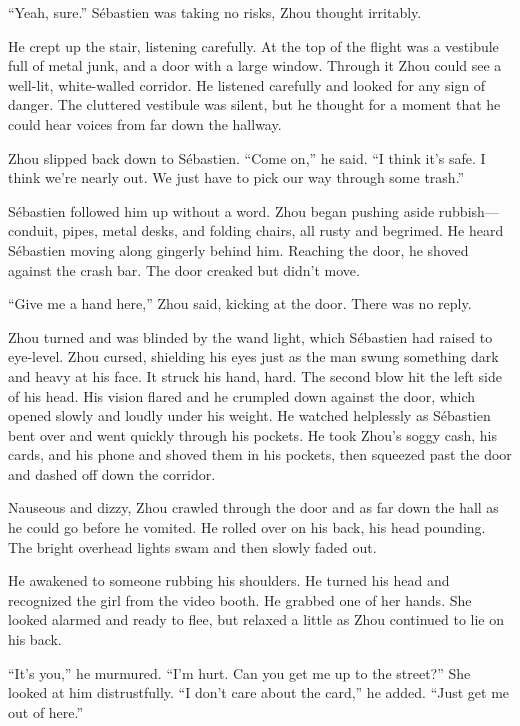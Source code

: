 \documentclass[10pt,a4paper]{article}
\begin{document}
``Yeah, sure.'' S\'{e}bastien was taking no risks, Zhou thought irritably.

He crept up the stair, listening carefully. At the top of the
flight was a vestibule full of metal junk, and a door with a
large window. Through it Zhou could see a well-lit, white-walled
corridor. He listened carefully and looked for any sign of danger.
The cluttered vestibule was silent, but he thought for a moment
that he could hear voices from far down the hallway.

Zhou slipped back down to S\'{e}bastien. ``Come on,'' he said. ``I think
it's safe. I think we're nearly out. We just have to pick our way
through some trash.''

S\'{e}bastien followed him up without a word. Zhou began pushing
aside rubbish---conduit, pipes, metal desks, and folding chairs,
all rusty and begrimed. He heard S\'{e}bastien moving along gingerly
behind him. Reaching the door, he shoved against the crash bar. The
door creaked but didn't move.

``Give me a hand here,'' Zhou said, kicking at the door. There was
no reply.

Zhou turned and was blinded by the wand light, which S\'{e}bastien had
raised to eye-level. Zhou cursed, shielding his eyes just as the man
swung something dark and heavy at his face. It struck his hand,
hard. The second blow hit the left side of his head. His vision
flared and he crumpled down against the door, which opened slowly
and loudly under his weight. He watched helplessly as S\'{e}bastien bent
over and went quickly through his pockets. He took Zhou's soggy
cash, his cards, and his phone and shoved them in his pockets,
then squeezed past the door and dashed off down the corridor.

Nauseous and dizzy, Zhou crawled through the door and as far down
the hall as he could go before he vomited. He rolled over on his
back, his head pounding. The bright overhead lights swam and then
slowly faded out.

\bigskip

He awakened to someone rubbing his shoulders. He turned his head
and recognized the girl from the video booth. He grabbed one of her
hands. She looked alarmed and ready to flee, but relaxed a little
as Zhou continued to lie on his back.

``It's you,'' he murmured. ``I'm hurt. Can you get me up to the street?''
She looked at him distrustfully. ``I don't care about the card,''
he added. ``Just get me out of here.''
\end{document}
